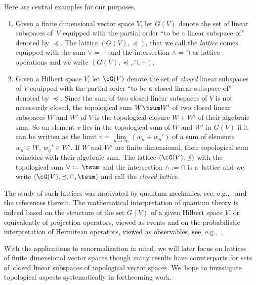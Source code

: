 \documentclass[pdftex]{sigma}
\numberwithin{equation}{section}
\begin{document}
Here are central examples for our purposes.
\begin{Example}\label{ex:GV}\qquad
\begin{enumerate}\itemsep=0pt
\item[$(a)$] %
 Given a finite dimensional vector space $V$, let $G(V)$ denote the set of linear subspaces of~$V$ equipped with
 the partial order ``to be a linear subspace of'' denoted by $\preceq$. The lattice $\left(G(V), \preceq\right)$, that we call the {\it \subsp lattice} comes equipped with
 the sum $\vee=+$ and the intersection $\wedge=\cap $ as lattice operations and we write $(G(V), \preceq, \cap, +)$.
\item[$(b)$]
Given a Hilbert space $V$, let $\cG(V)$ denote the set of {\it closed} linear subspaces of $V$ equipped with
the partial order ``to be a closed linear subspace of" denoted by $\preceq$. Since the sum of two closed linear subspaces of $V$ is not necessarily closed, the topological sum $W\tsum W'$ of two closed linear subspaces $W$ and $W'$ of $V$ is the topological closure $\overline{W+W'}$ of their algebraic sum. So an element $v$ lies in the topological sum of $W $ and $W'$ in $G(V)$ if it can be written as the limit $v=\underset{n\to \infty}{\lim}(w_n+w_n')$ of a sum of elements $w_n\in W$, $w_n'\in W'$. If $W$ and $W'$ are finite dimensional, their topological sum coincides with their algebraic sum.
The lattice $\left(\cG(V), \preceq\right)$ with the topological sum $\vee:=\tsum$ and the intersection $\wedge:=\cap $ is a~lattice and we write $(\cG(V), \preceq, \cap, \tsum)$ and call the {\it closed \subsp lattice}. 
\end{enumerate}
The study of such lattices was motivated by quantum mechanics, see, e.g.,~\cite{CL,EGL} and the references therein. The mathematical interpretation of quantum theory is indeed based on the structure of the set $\overline G(V)$ of a given Hilbert space $V$, or equivalently of projection operators, viewed as events and on the probabilistic interpretation of Hermitean operators, viewed as observables,
see, e.g.,~\cite[Section~16]{K}.
\end{Example}

\begin{Remark}
With the applications to renormalization in mind, we will later focus on \subsp lattices of finite
dimensional vector spaces though many results have counterparts for
sets of~closed linear subspaces of topological vector spaces. We~hope to investigate topological aspects systematically in forthcoming work.
\end{Remark}
\end{document}
